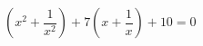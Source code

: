\begin{ex}[type=equation]
	\begin{condition}
		\( \left( x^2+\dfrac{1}{x^2} \right)+7\left( x+\dfrac{1}{x} \right)+10=0 \)
	\end{condition}
\end{ex}